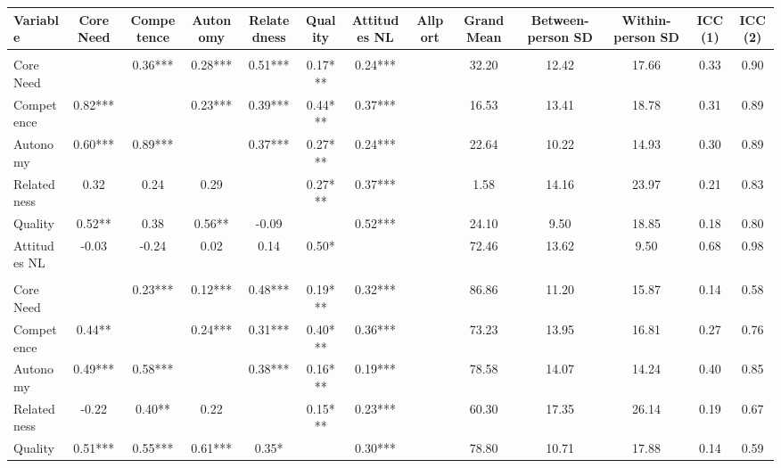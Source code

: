 
\begin{tabular}[t]{lcccccccccccc}
\toprule
Variable & Core Need & Competence & Autonomy & Relatedness & Quality & Attitudes NL & Allport & Grand Mean & Between-person SD & Within-person SD & ICC(1) & ICC(2)\\
\midrule
\addlinespace[0.3em]
\multicolumn{13}{l}{\textbf{Study 1}}\\
\hspace{1em}Core Need &  & 0.36*** & 0.28*** & 0.51*** & 0.17*** & 0.24*** &  & 32.20 & 12.42 & 17.66 & 0.33 & 0.90\\
\hspace{1em}Competence & 0.82*** &  & 0.23*** & 0.39*** & 0.44*** & 0.37*** &  & 16.53 & 13.41 & 18.78 & 0.31 & 0.89\\
\hspace{1em}Autonomy & 0.60*** & 0.89*** &  & 0.37*** & 0.27*** & 0.24*** &  & 22.64 & 10.22 & 14.93 & 0.30 & 0.89\\
\hspace{1em}Relatedness & 0.32 & 0.24 & 0.29 &  & 0.27*** & 0.37*** &  & 1.58 & 14.16 & 23.97 & 0.21 & 0.83\\
\hspace{1em}Quality & 0.52** & 0.38 & 0.56** & -0.09 &  & 0.52*** &  & 24.10 & 9.50 & 18.85 & 0.18 & 0.80\\
\hspace{1em}Attitudes NL & -0.03 & -0.24 & 0.02 & 0.14 & 0.50* &  &  & 72.46 & 13.62 & 9.50 & 0.68 & 0.98\\
\addlinespace[0.3em]
\multicolumn{13}{l}{\textbf{Study 2}}\\
\hspace{1em}Core Need &  & 0.23*** & 0.12*** & 0.48*** & 0.19*** & 0.32*** &  & 86.86 & 11.20 & 15.87 & 0.14 & 0.58\\
\hspace{1em}Competence & 0.44** &  & 0.24*** & 0.31*** & 0.40*** & 0.36*** &  & 73.23 & 13.95 & 16.81 & 0.27 & 0.76\\
\hspace{1em}Autonomy & 0.49*** & 0.58*** &  & 0.38*** & 0.16*** & 0.19*** &  & 78.58 & 14.07 & 14.24 & 0.40 & 0.85\\
\hspace{1em}Relatedness & -0.22 & 0.40** & 0.22 &  & 0.15*** & 0.23*** &  & 60.30 & 17.35 & 26.14 & 0.19 & 0.67\\
\hspace{1em}Quality & 0.51*** & 0.55*** & 0.61*** & 0.35* &  & 0.30*** &  & 78.80 & 10.71 & 17.88 & 0.14 & 0.59\\

\end{tabular}
